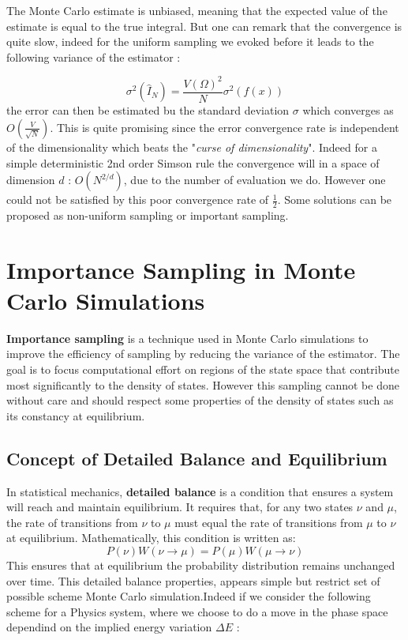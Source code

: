 \documentclass[ansiapaper]{report}
\begin{document}
\begin{multicols}{3}
The Monte Carlo estimate is unbiased, meaning that the expected value of the estimate is equal to the true integral. But one can remark that the convergence is quite slow, indeed for the uniform sampling we evoked before it leads to the following variance of the estimator :

\begin{equation}
    \sigma^2(\hat{I}_N)= \frac{V(\Omega)^2}{N}\sigma^2(f(x))
    \label{eq:Variance}
\end{equation}
the error can then be estimated bu the standard deviation $\sigma$ which converges as $O(\frac{V}{\sqrt{N}})
$. This is quite promising since the error convergence rate is independent of the dimensionality which beats the "\emph{curse of dimensionality}". Indeed for a simple deterministic 2nd order Simson rule the convergence will in a space of dimension $d$ : $O(N^{2 / d})$, due to the number of evaluation we do. However one could not be satisfied by this poor convergence rate of $\frac{1}{2}$. Some solutions can be proposed as non-uniform sampling or important sampling. 


\section{Importance Sampling in Monte Carlo Simulations}

\textbf{Importance sampling} is a technique used in Monte Carlo simulations to improve the efficiency of sampling by reducing the variance of the estimator. The goal is to focus computational effort on regions of the state space that contribute most significantly to the density of states. However this sampling cannot be done without care and should respect some properties of the density of states such as its constancy at equilibrium.

\subsection{Concept of Detailed Balance and Equilibrium}

In statistical mechanics, \textbf{detailed balance} is a condition that ensures a system will reach and maintain equilibrium. It requires that, for any two states \( \nu \) and \( \mu \), the rate of transitions from \( \nu \) to \( \mu \) must equal the rate of transitions from \( \mu \) to \( \nu \) at equilibrium. Mathematically, this condition is written as:
\begin{equation}    
P(\nu) W(\nu \to \mu) = P(\mu) W(\mu \to \nu)
    \label{eq:random-walker}
\end{equation}
This ensures that  at equilibrium the probability distribution remains unchanged over time. This detailed balance properties, appears simple but restrict set of possible scheme Monte Carlo simulation.Indeed if we consider the following scheme for a Physics system, where we choose to do a move in the phase space dependind on the implied energy variation $\Delta E$ :


\end{multicols}
\end{document}
